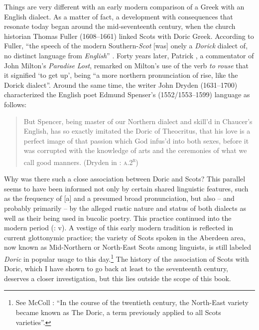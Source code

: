 Things are very different with an early modern comparison of a Greek with an English dialect. As a matter of fact, a development with consequences that resonate today began around the mid-seventeenth century, when the church historian Thomas Fuller (1608–1661) linked Scots with Doric Greek. According to Fuller, “the speech of the modern Southern-\textit{Scot} [was] onely a \textit{Dorick} dialect of, no distinct language from \textit{English}” \citep[81]{Fuller1655}. Forty years later, Patrick \citet[20]{Hume1695}, a commentator of John Milton’s \textit{Paradise} \textit{Lost}, remarked on Milton’s use of the verb \textit{to} \textit{rouse} that it signified ‘to get up’, being “a more northern pronunciation of rise, like the Dorick dialect”. Around the same time, the writer John Dryden (1631–1700) characterized the English poet Edmund Spenser’s (1552/1553–1599) language as follows:

\begin{quote}
But Spencer, being master of our Northern dialect and skill’d in Chaucer’s English, has so exactly imitated the Doric of Theocritus, that his love is a perfect image of that passion which God infus’d into both sexes, before it was corrupted with the knowledge of arts and the ceremonies of what we call good manners. (Dryden in \citealt{Vergil1697}: \textsc{a.2}\textsc{\textsuperscript{r}})
\end{quote}

Why was there such a close association between Doric and Scots? This parallel seems to have been informed not only by certain shared linguistic features, such as the frequency of [a] and a presumed broad pronunciation, but also – and probably primarily – by the alleged rustic nature and status of both dialects as well as their being used in bucolic poetry. This practice continued into the modern period (\citealt{Colvin1999}: v). A vestige of this early modern tradition is reflected in current glottonymic practice; the variety of Scots spoken in the Aberdeen area, now known as Mid-Northern or North-East Scots among linguists, is still labeled \textit{Doric} in popular usage to this day.\footnote{See McColl \citet[116]{Millar2007}: “In the course of the twentieth century, the North-East variety became known as The Doric, a term previously applied to all Scots varieties”.} The history of the association of Scots with Doric, which I have shown to go back at least to the seventeenth century, deserves a closer investigation, but this lies outside the scope of this book.

